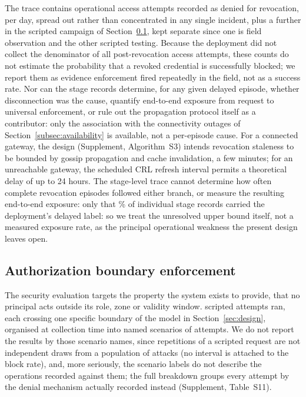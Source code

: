 \documentclass[a4paper,fleqn]{cas-sc}
\begin{document}
The trace contains \RevDenialsOperational{} operational access attempts
recorded as denied for revocation, \RevDenialsPerDay{} per day, spread out
rather than concentrated in any single incident, plus a further
\RevDenialsCampaign{} in the scripted campaign of
Section~\ref{subsec:security}, kept separate since one is field
observation and the other scripted testing. Because the deployment did
not collect the denominator of all post-revocation access attempts, these
counts do not estimate the probability that a revoked credential is
successfully blocked; we report them as evidence enforcement fired
repeatedly in the field, not as a success rate. Nor can the stage records
determine, for any given delayed episode, whether disconnection was the
cause, quantify end-to-end exposure from request to universal enforcement,
or rule out the propagation protocol itself as a contributor: only the
association with the connectivity outages of
Section~\ref{subsec:availability} is available, not a per-episode cause.
For a connected gateway, the design (Supplement, Algorithm~S3) intends
revocation staleness to be bounded by gossip propagation and cache
invalidation, a few minutes; for an unreachable gateway, the scheduled
CRL refresh interval permits a theoretical delay of up to 24 hours. The
stage-level trace cannot determine how often complete revocation
episodes followed either branch, or measure the resulting end-to-end
exposure: only that \RevDelayedPct\% of individual stage records
carried the deployment's delayed label: so we treat the unresolved
upper bound itself, not a measured exposure rate, as the principal
operational weakness the present design leaves open.

\subsection{Authorization boundary enforcement}
\label{subsec:security}

The security evaluation targets the property the system exists to provide,
that no principal acts outside its role, zone or validity window.
\SecAttempts{} scripted attempts ran, each crossing one specific boundary of
the model in Section~\ref{sec:design}, organised at collection time into
\SecScenarios{} named scenarios of \SecPerScenario{} attempts. We do not
report the results by those scenario names, since repetitions of a
scripted request are not independent draws from a population of attacks
(no interval is attached to the block rate), and, more seriously, the
scenario labels do not describe the operations recorded against them; the
full breakdown groups every attempt by the denial mechanism actually
recorded instead (Supplement, Table~S11).
\end{document}
